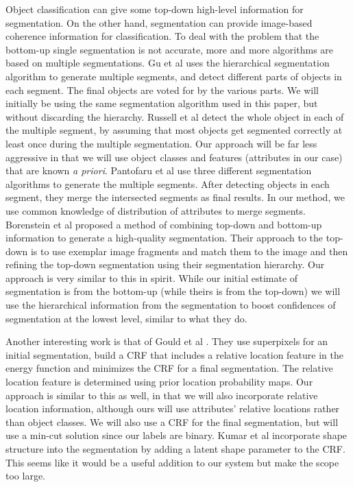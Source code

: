 \documentclass[10pt,twocolumn,letterpaper]{article}
\begin{document}
Object classification can give some top-down high-level information
for segmentation. On the other hand, segmentation can provide
image-based coherence information for classification. To deal with
the problem that the bottom-up single segmentation is not accurate,
more and more algorithms are based on multiple segmentations. Gu et
al \cite{gu09} uses the hierarchical segmentation algorithm to
generate multiple segments, and detect different parts of objects in
each segment. The final objects are voted for by the various parts.
We will initially be using the same segmentation algorithm used in
this paper, but without discarding the hierarchy.
Russell et al \cite{russell06} detect the whole object in each of
the multiple segment, by assuming that most objects get segmented
correctly at least once during the multiple segmentation. Our approach
will be far less aggressive in that we will use object classes and 
features (attributes in our case) that are known \emph{a priori}.
Pantofaru et
al \cite{pantofaru} use three different segmentation algorithms to
generate the multiple segments. After detecting objects in each
segment, they merge the intersected segments as final results. In
our method, we use common knowledge of distribution of attributes to
merge segments.
Borenstein et al \cite{borenstein04} proposed a method of combining top-down
and bottom-up information to generate a high-quality segmentation.  Their
approach to the top-down is to use exemplar image fragments and match them
to the image and then refining the top-down segmentation using their
segmentation hierarchy.  Our approach is very similar to this in spirit.
While our initial estimate of segmentation is from the bottom-up (while
theirs is from the top-down) we will use the hierarchical information
from the segmentation to boost confidences of segmentation at the lowest
level, similar to what they do.

Another interesting work is that of Gould et al \cite{gould08}.  They use
superpixels for an initial segmentation, build a CRF that includes a
relative location feature in the energy function and minimizes the CRF
for a final segmentation.  The relative location feature is determined
using prior location probability maps.  Our approach is similar to this
as well, in that we will also incorporate relative location information,
although ours will use attributes' relative locations rather than object
classes.  We will also use a CRF for the final segmentation, but will
use a min-cut solution since our labels are binary.
Kumar et al \cite{kumar05} incorporate shape structure into the segmentation by
adding a latent shape parameter to the CRF.  This seems like it would be
a useful addition to our system but make the scope too large.
\end{document}
